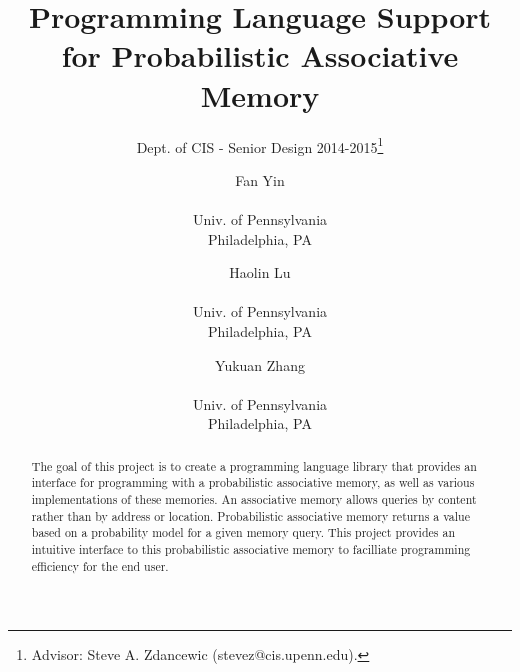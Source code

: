\documentclass{sig-alternate}
\begin{document}
 

\title{Programming Language Support for Probabilistic Associative Memory}
\subtitle{Dept. of CIS - Senior Design 2014-2015\thanks{Advisor: Steve A. Zdancewic (stevez@cis.upenn.edu).}}
\author{
    Fan Yin \\  \\Univ. of Pennsylvania \\ Philadelphia, PA
    \and Haolin Lu \\  \\Univ. of Pennsylvania \\ Philadelphia, PA
    \and Yukuan Zhang\\  \\Univ. of Pennsylvania \\ Philadelphia, PA
}
%
%
\date{}
\maketitle

\begin{abstract}
    The goal of this project is to create a programming language library that provides an interface
    for programming with a probabilistic associative memory, as well as various implementations of these memories. 
    An associative memory allows queries by content rather than by address or location.
    Probabilistic associative memory returns a value based on a probability model
    for a given memory query. This project provides an intuitive interface to this probabilistic
    associative memory to facilliate programming efficiency for the end user.

\end{abstract}
\end{document}
